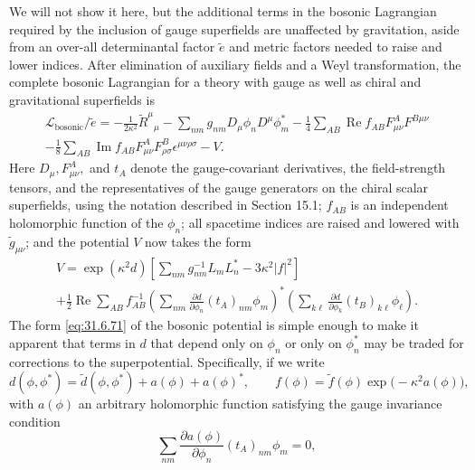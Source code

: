 We will not show it here, but the additional terms in the bosonic
Lagrangian required by the inclusion of gauge superfields are
unaffected by gravitation, aside from an over-all determinantal factor
\(\widetilde e\) and metric factors needed to raise and lower indices.
After elimination of auxiliary fields and a Weyl transformation, the
complete bosonic Lagrangian for a theory with gauge as well as chiral
and gravitational superfields is
\begin{multline}
  \mathcal L_{\mathrm{bosonic}}/\widetilde e
  =-\frac{1}{2\kappa^2}\widetilde R^\mu{}_\mu
   -\sum_{nm}g_{nm}D_\mu\phi_nD^\mu\phi_m^*
   -\frac{1}{4}\sum_{AB}\operatorname{Re}f_{AB}
     F_{\mu\nu}^AF^{B\mu\nu}\\
  -\frac{1}{8}\sum_{AB}\operatorname{Im}f_{AB}
     F_{\mu\nu}^AF_{\rho\sigma}^B\epsilon^{\mu\nu\rho\sigma}
  -V.
  \tag{31.6.70}\label{eq:31.6.70}
\end{multline}
Here \(D_\mu,F_{\mu\nu}^A,\) and \(t_A\) denote the gauge-covariant
derivatives, the field-strength tensors, and the representatives of the
gauge generators on the chiral scalar superfields, using the notation
described in Section 15.1; \(f_{AB}\) is an independent holomorphic
function of the \(\phi_n\); all spacetime indices are raised and lowered
with \(\widetilde g_{\mu\nu}\); and the potential \(V\) now takes the
form
\begin{multline}
  V
  =\exp(\kappa^2d)\left[
    \sum_{nm}g^{-1}_{nm}L_mL_n^*
    -3\kappa^2|f|^2
  \right]\\
  +\frac{1}{2}\operatorname{Re}\sum_{AB}f^{-1}_{AB}
    \left(
      \sum_{nm}\frac{\partial d}{\partial\phi_n}
      (t_A)_{nm}\phi_m
    \right)^*
    \left(
      \sum_{k\ell}\frac{\partial d}{\partial\phi_k}
      (t_B)_{k\ell}\phi_\ell
    \right).
  \tag{31.6.71}\label{eq:31.6.71}
\end{multline}
The form \eqref{eq:31.6.71} of the bosonic potential is simple enough to
make it apparent that terms in \(d\) that depend only on \(\phi_n\) or
only on \(\phi_n^*\) may be traded for corrections to the
superpotential. Specifically, if we write
\begin{equation}
  d(\phi,\phi^*)
  =\widetilde d(\phi,\phi^*)+a(\phi)+a(\phi)^*,
  \qquad
  f(\phi)=\widetilde f(\phi)\exp\bigl(-\kappa^2a(\phi)\bigr),
  \tag{31.6.72}\label{eq:31.6.72}
\end{equation}
with \(a(\phi)\) an arbitrary holomorphic function satisfying the gauge
invariance condition
\[
  \sum_{nm}\frac{\partial a(\phi)}{\partial\phi_n}
    (t_A)_{nm}\phi_m=0,
\]
